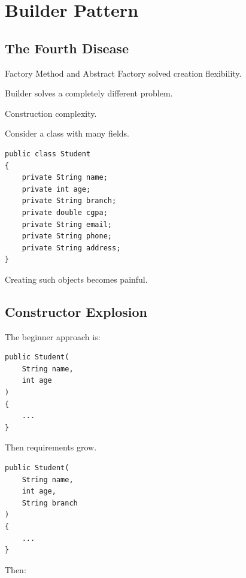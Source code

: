 \documentclass[11pt,a4paper]{book}
\begin{document}
\chapter{Builder Pattern}

\section{The Fourth Disease}

\begin{idea}

Factory Method and Abstract Factory solved
creation flexibility.

Builder solves a completely different problem.

Construction complexity.

\end{idea}

Consider a class with many fields.

\begin{verbatim}
public class Student
{
    private String name;
    private int age;
    private String branch;
    private double cgpa;
    private String email;
    private String phone;
    private String address;
}
\end{verbatim}

Creating such objects becomes painful.


\section{Constructor Explosion}

The beginner approach is:

\begin{verbatim}
public Student(
    String name,
    int age
)
{
    ...
}
\end{verbatim}

Then requirements grow.

\begin{verbatim}
public Student(
    String name,
    int age,
    String branch
)
{
    ...
}
\end{verbatim}

Then:
\end{document}
